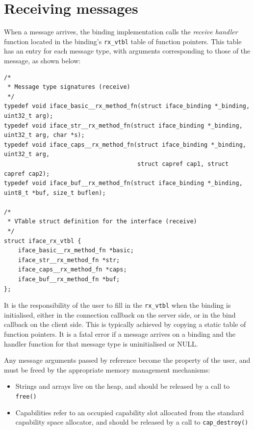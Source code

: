 \documentclass[a4paper,twoside]{report} %
\begin{document}
\section{Receiving messages}\label{sec:binding_rx}

When a message arrives, the binding implementation calls the \emph{receive
handler} function located in the binding's \lstinline+rx_vtbl+ table of function
pointers. This table has an entry for each message type, with arguments
corresponding to those of the message, as shown below:

\begin{lstlisting}
/*
 * Message type signatures (receive)
 */
typedef void iface_basic__rx_method_fn(struct iface_binding *_binding, uint32_t arg);
typedef void iface_str__rx_method_fn(struct iface_binding *_binding, uint32_t arg, char *s);
typedef void iface_caps__rx_method_fn(struct iface_binding *_binding, uint32_t arg,
                                      struct capref cap1, struct capref cap2);
typedef void iface_buf__rx_method_fn(struct iface_binding *_binding, uint8_t *buf, size_t buflen);

/*
 * VTable struct definition for the interface (receive)
 */
struct iface_rx_vtbl {
    iface_basic__rx_method_fn *basic;
    iface_str__rx_method_fn *str;
    iface_caps__rx_method_fn *caps;
    iface_buf__rx_method_fn *buf;
};
\end{lstlisting}

It is the responsibility of the user to fill in the \lstinline+rx_vtbl+ when
the binding is initialised, either in the connection callback on the
server side, or in the bind callback on the client side. This is typically
achieved by copying a static table of function pointers. It is a fatal error
if a message arrives on a binding and the handler function for that message
type is uninitialised or NULL.

Any message arguments passed by reference become the property of the user, and
must be freed by the appropriate memory management mechanisms:

\begin{itemize}
 \item Strings and arrays live on the heap, and should be
    released by a call to \lstinline+free()+
 \item Capabilities refer to an occupied capability slot allocated from the
    standard capability space allocator, and should be released by a call to
    \lstinline+cap_destroy()+
\end{itemize}
\end{document}

